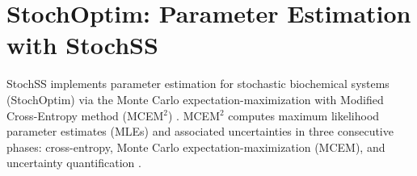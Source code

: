 \chapter{StochOptim: Parameter Estimation with StochSS}
\label{chapter-stochoptim}

StochSS implements parameter estimation for stochastic biochemical systems (StochOptim) via the Monte Carlo expectation-maximization with Modified Cross-Entropy method (MCEM$^2$) \cite{bernie}.
MCEM$^2$ computes maximum likelihood parameter estimates (MLEs) and associated uncertainties in three consecutive phases: cross-entropy, Monte Carlo expectation-maximization (MCEM), and uncertainty quantification \cite{bernie}.


